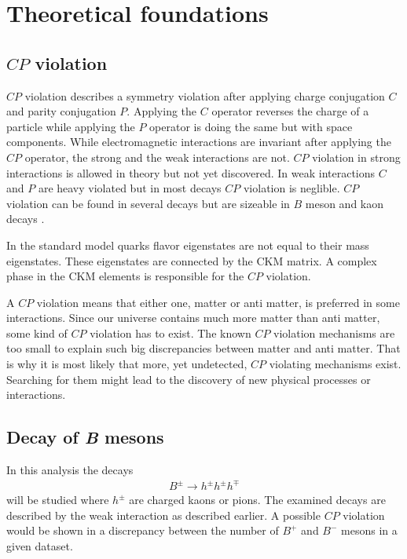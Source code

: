 \section{Theoretical foundations}
\label{sec:Theorie}
\subsection{$C\!P$ violation}

$C\!P$ violation describes a symmetry violation after applying charge conjugation $C$ and parity conjugation $P$.
Applying the $C$ operator reverses the charge of a particle while applying the $P$ operator is doing the same but with space components.
While electromagnetic interactions are invariant after applying the $C\!P$ operator, the strong and the weak interactions are not.
$C\!P$ violation in strong interactions is allowed in theory but not yet discovered.
In weak interactions $C$ and $P$ are heavy violated but in most decays $C\!P$ violation is neglible.
$C\!P$ violation can be found in several decays but are sizeable in $B$ meson and kaon decays .

In the standard model quarks flavor eigenstates are not equal to their mass eigenstates.
These eigenstates are connected by the CKM matrix.
A complex phase in the CKM elements is responsible for the $C\!P$ violation.

A $C\!P$ violation means that either one, matter or anti matter, is preferred in some interactions.
Since our universe contains much more matter than anti matter, some kind of $C\!P$ violation has to exist.
The known $C\!P$ violation mechanisms are too small to explain such big discrepancies between matter and anti matter.
That is why it is most likely that more, yet undetected, $C\!P$ violating mechanisms exist.
Searching for them might lead to the discovery of new physical processes or interactions.

\subsection{Decay of \textit{B} mesons}
In this analysis the decays
\begin{align}
    B^{\pm} \to h^{\pm} h^{\pm}  h^{\mp}
\end{align}
will be studied where $h^{\pm}$ are charged kaons or pions.
The examined decays are described by the weak interaction as described earlier.
A possible $C\!P$ violation would be shown in a discrepancy between the number of $B^+$ and $B^-$ mesons in a given dataset.

